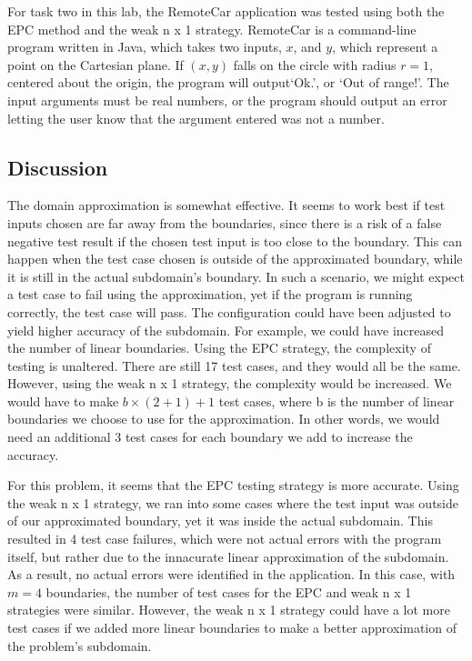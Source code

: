 For task two in this lab, the RemoteCar application was tested using both the
EPC method and the weak n x 1 strategy. RemoteCar is a command-line program
written in Java, which takes two inputs, $x$, and $y$, which represent a
point on the Cartesian plane.
If $(x,y)$ falls on the circle with radius $r=1$, centered about the origin,
the program will output`Ok.', or `Out of range!'. The input arguments must
be real numbers, or the program should output an error letting the user know
that the argument entered was not a number.

\subsection{Discussion}
The domain approximation is somewhat effective. It seems to work best if
test inputs chosen are far away from the boundaries, since there is a risk
of a false negative test result if the chosen test input is too close to the
boundary. This can happen when the test case chosen is outside of the
approximated boundary, while it is still in the actual subdomain's boundary.
In such a scenario, we might expect a test case to fail using the
approximation, yet if the program is running correctly, the test case will
pass. The configuration could have been adjusted to yield higher accuracy
of the subdomain. For example, we could have increased the number of linear
boundaries. Using the EPC strategy, the complexity of testing is unaltered. 
There are still 17 test cases, and they would all be the same. However,
using the weak n x 1 strategy, the complexity would be increased.
We would have to make $b \times (2 + 1) + 1$ test cases, where b is
the number of linear boundaries we choose to use for the approximation.
In other words, we would need an additional 3 test cases for each boundary
we add to increase the accuracy. 

For this problem, it seems that the EPC testing strategy is more accurate.
Using the weak n x 1 strategy, we ran into some cases where the test input
was outside of our approximated boundary, yet it was inside the actual
subdomain. This resulted in 4 test case failures, which were not actual
errors with the program itself, but rather due to the innacurate linear
approximation of the subdomain. As a result, no actual errors were identified 
in the application. In this case, with $m=4$ boundaries, the number of test
cases for the EPC and weak n x 1 strategies were similar. However, 
the weak n x 1 strategy could have a lot more test cases if we added more 
linear boundaries to make a better approximation of the problem's subdomain.
